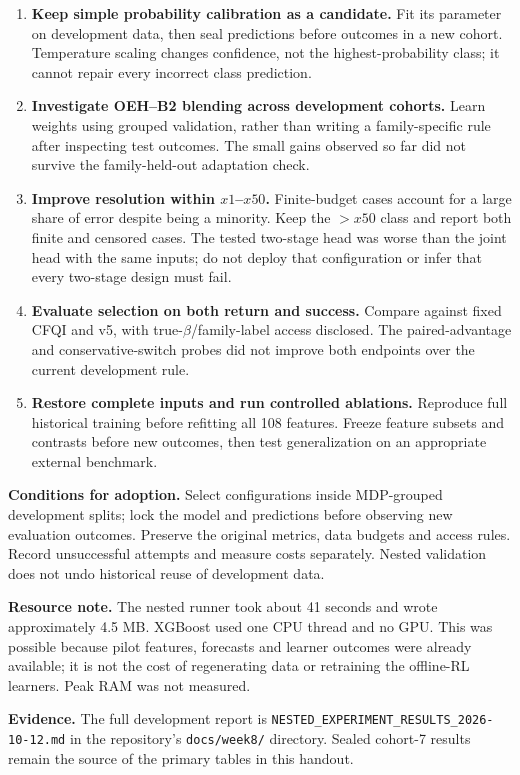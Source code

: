 \documentclass[10pt,a4paper]{article}
\begin{document}
\begin{enumerate}
\item \textbf{Keep simple probability calibration as a candidate.} Fit its parameter on development data, then seal predictions before outcomes in a new cohort. Temperature scaling changes confidence, not the highest-probability class; it cannot repair every incorrect class prediction.
\item \textbf{Investigate OEH--B2 blending across development cohorts.} Learn weights using grouped validation, rather than writing a family-specific rule after inspecting test outcomes. The small gains observed so far did not survive the family-held-out adaptation check.
\item \textbf{Improve resolution within $x1$--$x50$.} Finite-budget cases account for a large share of error despite being a minority. Keep the $>x50$ class and report both finite and censored cases. The tested two-stage head was worse than the joint head with the same inputs; do not deploy that configuration or infer that every two-stage design must fail.
\item \textbf{Evaluate selection on both return and success.} Compare against fixed CFQI and v5, with true-$\beta$/family-label access disclosed. The paired-advantage and conservative-switch probes did not improve both endpoints over the current development rule.
\item \textbf{Restore complete inputs and run controlled ablations.} Reproduce full historical training before refitting all 108 features. Freeze feature subsets and contrasts before new outcomes, then test generalization on an appropriate external benchmark.
\end{enumerate}

\textbf{Conditions for adoption.} Select configurations inside MDP-grouped development splits; lock the model and predictions before observing new evaluation outcomes. Preserve the original metrics, data budgets and access rules. Record unsuccessful attempts and measure costs separately. Nested validation does not undo historical reuse of development data.

\textbf{Resource note.} The nested runner took about 41 seconds and wrote approximately 4.5 MB. XGBoost used one CPU thread and no GPU. This was possible because pilot features, forecasts and learner outcomes were already available; it is not the cost of regenerating data or retraining the offline-RL learners. Peak RAM was not measured.

\textbf{Evidence.} The full development report is
\texttt{NESTED\_EXPERIMENT\_RESULTS\_2026-10-12.md}
in the repository's \texttt{docs/week8/} directory. Sealed cohort-7 results remain the source of the primary tables in this handout.
\end{document}
